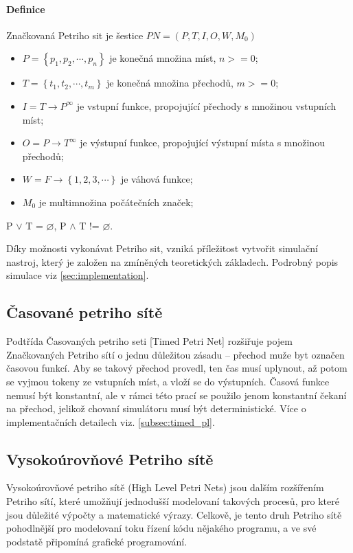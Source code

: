 \paragraph{Definice}

Značkovaná Petriho sit je šestice $PN = \left(P, T, I, O, W, M_0\right)$
\begin{itemize}
  \item $P = \left\{p_1, p_2, \cdots , p_n\right\}$ je konečná množina míst, $n >= 0$; \\
  \item $T = \left\{t_1, t_2, \cdots , t_m\right\}$ je konečná množina přechodů, $m >= 0$; \\
  \item $I = T \rightarrow P^\infty$ je vstupní funkce, propojující přechody s množinou vstupních míst; \\
  \item $O = P \rightarrow T^\infty$ je výstupní funkce, propojující výstupní místa s množinou přechodů; \\
  \item $W = F \rightarrow \left\{1, 2, 3, \cdots \right\}$ je váhová funkce; \\
  \item $M_0$ je multimnožina počátečních značek;
\end{itemize}
P $\vee$ T = $\varnothing$, P $\wedge$ T != $\varnothing$.

Díky možnosti vykonávat Petriho sit, vzniká příležitost vytvořit simulační nastroj, který je založen na zmíněných teoretických základech. Podrobný popis simulace viz \ref{sec:implementation}.

\subsection{Časované petriho sítě}
Podtřída Časovaných petriho seti [Timed Petri Net] rozšiřuje pojem Značkovaných Petriho sítí o jednu důležitou zásadu -- přechod muže byt označen časovou funkcí. Aby se takový přechod provedl, ten čas musí uplynout, až potom se vyjmou tokeny ze vstupních míst, a vloží se do výstupních. Časová funkce nemusí být konstantní, ale v rámci této prací se použilo jenom konstantní čekaní na přechod, jelikož chovaní simulátoru musí být deterministické. Více o implementačních detailech viz. \ref{subsec:timed_pl}.

\subsection{Vysokoúrovňové Petriho sítě}
\label{sec:hlpn}
Vysokoúrovňové petriho sítě (High Level Petri Nets) jsou dalším rozšířením Petriho sítí, které umožňují jednodušší modelovaní takových procesů, pro které jsou důležité výpočty a matematické výrazy. Celkově, je tento druh Petriho sítě pohodlnější pro modelovaní toku řízení kódu nějakého programu, a ve své podstatě připomíná grafické programování.

